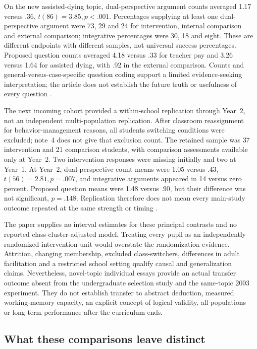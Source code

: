 On the new assisted-dying topic, dual-perspective argument counts averaged
1.17 versus .36, \(t(86)=3.85,p<.001\). Percentages supplying at
least one dual-perspective argument were 73, 29 and 24 for intervention,
internal comparison and external comparison; integrative percentages were
30, 18 and eight. These are different endpoints with different samples,
not universal success percentages. Proposed question counts averaged
4.18 versus .33 for teacher pay and 3.26 versus 1.64 for assisted dying,
with .92 in the external comparison. Counts and general-versus-case-specific
question coding support a limited evidence-seeking interpretation; the
article does not establish the future truth or usefulness of every question
\cite[pp.~549--551, tables~2--5]{KuhnCrowell2011Dialogic}.

The next incoming cohort provided a within-school replication through
Year~2, not an independent multi-population replication. After classroom
reassignment for behavior-management reasons, all students switching
conditions were excluded; note~4 does not give that exclusion count.
The retained sample was 37 intervention and 21 comparison students,
with comparison assessments available only at Year~2. Two intervention
responses were missing initially and two at Year~1. At Year~2,
dual-perspective count means were 1.05 versus .43,
\(t(56)=2.81,p=.007\), and integrative arguments appeared in 14
versus zero percent. Proposed question means were 1.48 versus .90,
but their difference was not significant, \(p=.148\). Replication
therefore does not mean every main-study outcome repeated at the same
strength or timing
\cite[pp.~550--552, table~6, note~4]{KuhnCrowell2011Dialogic}.

The paper supplies no interval estimates for these principal contrasts
and no reported class-cluster-adjusted model. Treating every pupil as
an independently randomized intervention unit would overstate the
randomization evidence. Attrition, changing membership, excluded
class-switchers, differences in adult facilitation and a restricted
school setting qualify causal and generalization claims. Nevertheless,
novel-topic individual essays provide an actual transfer outcome absent
from the undergraduate selection study and the same-topic 2003 experiment.
They do not establish transfer to abstract deduction, measured working-memory
capacity, an explicit concept of logical validity, all populations or
long-term performance after the curriculum ends.

\subsection{What these comparisons leave distinct}
\label{sec:p19-r151-social-capacity-boundary}

